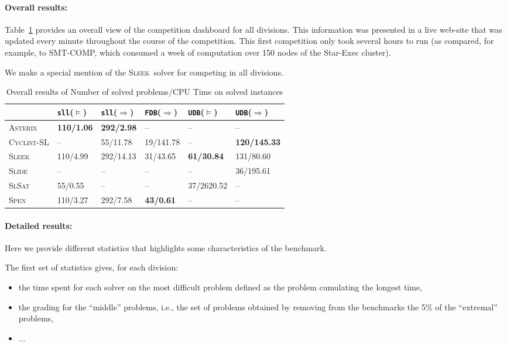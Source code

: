 \documentclass[twoside,11pt]{article}
\newcommand{\limp}{\Rightarrow}
\newcommand{\sllsat}{\texttt{sll}($\models$)}
\newcommand{\sllent}{\texttt{sll}($\limp$)}
\newcommand{\FDBent}{\texttt{FDB}($\limp$)}
\newcommand{\UDBsat}{\texttt{UDB}($\models$)}
\newcommand{\UDBent}{\texttt{UDB}($\limp$)}
\newcommand{\ASTERIX}{\textsc{Asterix}}
\newcommand{\CYCLIST}{\textsc{Cyclist-SL}}
\newcommand{\SLEEK}{\textsc{Sleek}}
\newcommand{\SLIDE}{\textsc{Slide}}
\newcommand{\SLSAT}{\textsc{SlSat}}
\newcommand{\SPEN}{\textsc{Spen}}
\begin{document}
\paragraph{Overall results:}
Table~\ref{tab:overall} provides an overall view of the competition dashboard for all divisions. This information was presented in a live web-site that was updated every minute throughout the course of the competition. This first competition only took several hours to run (as compared, for example, to SMT-COMP, which consumed a week of computation over 150 nodes of the Star-Exec cluster).
 
We make a special mention of the \SLEEK\ solver for competing in all divisions.


\begin{table}
\begin{center}
\begin{tabular}{p{2cm}p{2cm}p{2cm}p{2cm}p{2cm}p{2cm}}\hline
& \sllsat & \sllent & \FDBent
& \UDBsat & \UDBent \\\hline
\ASTERIX &
\textbf{110/1.06} &  %
\textbf{292/2.98} &  %
-- &
-- &
--
\\\hline
\CYCLIST &
-- &
55/11.78 & %
19/141.78 & %
-- &
\textbf{120/145.33} %
\\\hline
\SLEEK &
110/4.99 & %
292/14.13 & %
31/43.65 & %
\textbf{61/30.84} & %
131/80.60 %
\\\hline
\SLIDE &
-- &
-- &
-- &
-- &
36/195.61 %
\\\hline
\SLSAT &
55/0.55 & %
--  &
--  &
37/2620.52 & %
--
\\\hline
\SPEN &
110/3.27 & %
292/7.58 & %
\textbf{43/0.61} & %
-- &
--
\\\hline
\end{tabular}
\end{center}
\caption{Overall results of Number of solved problems/CPU Time on solved instances %
}
\label{tab:overall}
\end{table}


\paragraph{Detailed results:}
Here we provide different statistics that highlights some characteristics of the benchmark. 

The first set of statistics gives, for each division:
\begin{itemize}
\item the time spent for each solver on the most difficult problem defined as the problem cumulating the longest time,
\item the grading for the ``middle'' problems, i.e., the set of problems obtained by removing from the benchmarks the 5\% of the ``extremal'' problems,
\item ...
\end{itemize}
\end{document}
